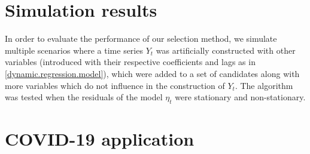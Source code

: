\documentclass[a4paper]{easychair}
\begin{document}
\section{Simulation results}

In order to evaluate the performance of our selection method, we simulate multiple scenarios where a time series $Y_t$ was artificially constructed with other variables (introduced with their respective coefficients and lags as in \ref{dynamic.regression.model}), which were added to a set of candidates along with more variables which do not influence in the construction of $Y_t$. The algorithm was tested when the residuals of the model $\eta_t$ were stationary and non-stationary. 





\section{COVID-19 application}





\end{document}
